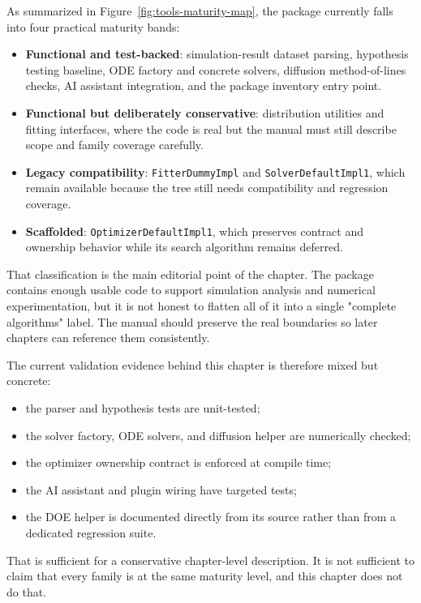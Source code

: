 As summarized in Figure~\ref{fig:tools-maturity-map}, the package currently falls into four practical maturity bands:
\begin{itemize}
\item \textbf{Functional and test-backed}: simulation-result dataset parsing, hypothesis testing baseline, ODE factory and concrete solvers, diffusion method-of-lines checks, AI assistant integration, and the package inventory entry point.
\item \textbf{Functional but deliberately conservative}: distribution utilities and fitting interfaces, where the code is real but the manual must still describe scope and family coverage carefully.
\item \textbf{Legacy compatibility}: \texttt{FitterDummyImpl} and \texttt{SolverDefaultImpl1}, which remain available because the tree still needs compatibility and regression coverage.
\item \textbf{Scaffolded}: \texttt{OptimizerDefaultImpl1}, which preserves contract and ownership behavior while its search algorithm remains deferred.
\end{itemize}

That classification is the main editorial point of the chapter. The package contains enough usable code to support simulation analysis and numerical experimentation, but it is not honest to flatten all of it into a single "complete algorithms" label. The manual should preserve the real boundaries so later chapters can reference them consistently.

The current validation evidence behind this chapter is therefore mixed but concrete:
\begin{itemize}
\item the parser and hypothesis tests are unit-tested;
\item the solver factory, ODE solvers, and diffusion helper are numerically checked;
\item the optimizer ownership contract is enforced at compile time;
\item the AI assistant and plugin wiring have targeted tests;
\item the DOE helper is documented directly from its source rather than from a dedicated regression suite.
\end{itemize}

That is sufficient for a conservative chapter-level description. It is not sufficient to claim that every family is at the same maturity level, and this chapter does not do that.
